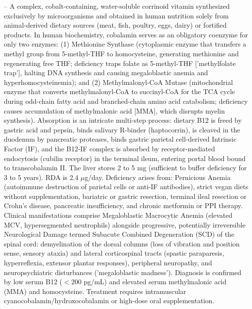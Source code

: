 -- A complex, cobalt-containing, water-soluble corrinoid vitamin synthesized exclusively by microorganisms and obtained in human nutrition solely from animal-derived dietary sources (meat, fish, poultry, eggs, dairy) or fortified products. In human biochemistry, cobalamin serves as an obligatory coenzyme for only two enzymes: (1) Methionine Synthase (cytoplasmic enzyme that transfers a methyl group from 5-methyl-THF to homocysteine, generating methionine and regenerating free THF; deficiency traps folate as 5-methyl-THF ['methylfolate trap'], halting DNA synthesis and causing megaloblastic anemia and hyperhomocysteinemia); and (2) Methylmalonyl-CoA Mutase (mitochondrial enzyme that converts methylmalonyl-CoA to succinyl-CoA for the TCA cycle during odd-chain fatty acid and branched-chain amino acid catabolism; deficiency causes accumulation of methylmalonic acid [MMA], which disrupts myelin synthesis). Absorption is an intricate multi-step process: dietary B12 is freed by gastric acid and pepsin, binds salivary R-binder (haptocorrin), is cleaved in the duodenum by pancreatic proteases, binds gastric parietal cell-derived Intrinsic Factor (IF), and the B12-IF complex is absorbed by receptor-mediated endocytosis (cubilin receptor) in the terminal ileum, entering portal blood bound to transcobalamin II. The liver stores 2 to 5 mg (sufficient to buffer deficiency for 3 to 5 years). RDA is 2.4 $\mu$g/day. Deficiency arises from: Pernicious Anemia (autoimmune destruction of parietal cells or anti-IF antibodies), strict vegan diets without supplementation, bariatric or gastric resection, terminal ileal resection or Crohn's disease, pancreatic insufficiency, and chronic metformin or PPI therapy. Clinical manifestations comprise Megaloblastic Macrocytic Anemia (elevated MCV, hypersegmented neutrophils) alongside progressive, potentially irreversible Neurological Damage termed Subacute Combined Degeneration (SCD) of the spinal cord: demyelination of the dorsal columns (loss of vibration and position sense, sensory ataxia) and lateral corticospinal tracts (spastic paraparesis, hyperreflexia, extensor plantar responses), peripheral neuropathy, and neuropsychiatric disturbances ('megaloblastic madness'). Diagnosis is confirmed by low serum B12 ($<200$ pg/mL) and elevated serum methylmalonic acid (MMA) and homocysteine. Treatment requires intramuscular cyanocobalamin/hydroxocobalamin or high-dose oral supplementation.

